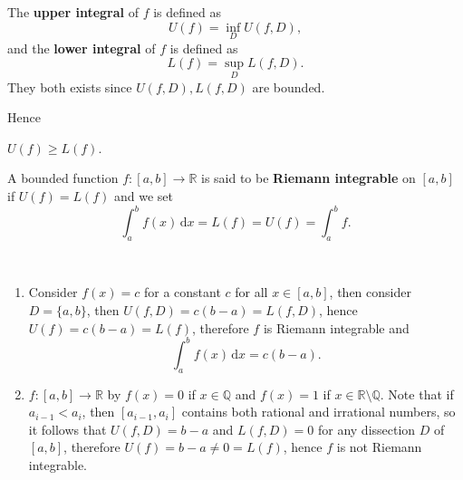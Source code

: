 \begin{definition}
    The \textbf{upper integral} of $f$ is defined as 
    \[
        U(f) = \inf_D U(f,D),
    \]
    and the \textbf{lower integral} of $f$ is defined as 
    \[
        L(f) = \sup_D L(f,D).
    \]
    They both exists since $ U(f,D),L(f,D) $ are bounded.
\end{definition}
Hence 
\begin{sprop}
    $U(f)\ge L(f)$.
\end{sprop}

\begin{definition}
    A bounded function $ f:[a,b]\to \mathbb{R}  $ is said to be \textbf{Riemann integrable} on $[a,b]$ if $ U(f)=L(f) $ and we set
    $$\int_a^bf(x)\,\mathrm dx=L(f)=U(f) = \int_{a}^{b} f.$$
\end{definition}
\begin{example}\
    \begin{enumerate}
        \item Consider $f(x)=c$ for a constant $c$ for all $x\in [a,b]$, then consider $D=\{a,b\}$, then $U(f,D)=c(b-a)=L(f,D)$, hence $U(f)=c(b-a)=L(f)$, therefore $f$ is Riemann integrable and
        $$\int_a^bf(x)\,\mathrm dx=c(b-a).$$
        \item $f:[a,b]\to\mathbb R$ by $f(x)=0$ if $x\in\mathbb Q$ and $f(x)=1$ if $x\in\mathbb R\setminus\mathbb Q$. Note that if $a_{i-1}<a_i$, then $[a_{i-1},a_i]$ contains both rational and irrational numbers, so it follows that $U(f,D)=b-a$ and $L(f,D)=0$ for any dissection $D$ of $[a,b]$, therefore $U(f)=b-a\neq 0=L(f)$, hence $f$ is not Riemann integrable.
    \end{enumerate}
\end{example}

